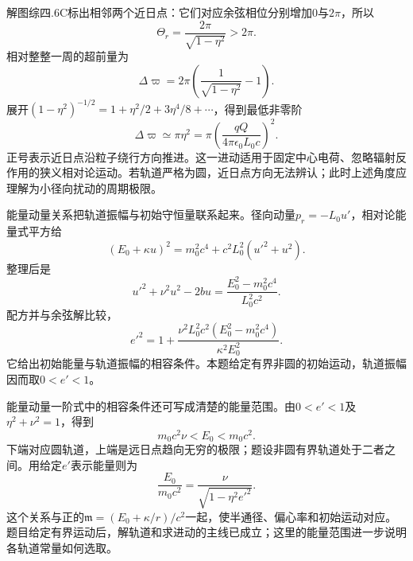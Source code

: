 \documentclass[UTF8,fontset=fandol,a4paper,11pt]{ctexart}
\begin{document}
解图综四.6C标出相邻两个近日点：它们对应余弦相位分别增加$0$与$2\pi$，所以
\[
\boxed{\Theta_r=\frac{2\pi}{\sqrt{1-\eta^2}}>2\pi}.
\]
相对整整一周的超前量为
\[
\boxed{\Delta\varpi=
2\pi\left(\frac1{\sqrt{1-\eta^2}}-1\right)}.
\]
展开$(1-\eta^2)^{-1/2}=1+\eta^2/2+3\eta^4/8+\cdots$，得到最低非零阶
\[
\boxed{\Delta\varpi\simeq\pi\eta^2
=\pi\left(\frac{qQ}{4\pi\epsilon_0L_0c}\right)^2}.
\]
正号表示近日点沿粒子绕行方向推进。这一进动适用于固定中心电荷、忽略辐射反作用的狭义相对论运动。若轨道严格为圆，近日点方向无法辨认；此时上述角度应理解为小径向扰动的周期极限。

能量动量关系把轨道振幅与初始守恒量联系起来。径向动量$p_r=-L_0u'$，相对论能量式平方给
\[
(E_0+\kappa u)^2
=m_0^2c^4+c^2L_0^2(u'^2+u^2).
\]
整理后是
\[
u'^2+\nu^2u^2-2bu
=\frac{E_0^2-m_0^2c^4}{L_0^2c^2}.
\]
配方并与余弦解比较，
\[
e'^2=1+
\frac{\nu^2L_0^2c^2(E_0^2-m_0^2c^4)}{\kappa^2E_0^2}.
\]
它给出初始能量与轨道振幅的相容条件。本题给定有界非圆的初始运动，轨道振幅因而取$0<e'<1$。

能量动量一阶式中的相容条件还可写成清楚的能量范围。由$0<e'<1$及$\eta^2+\nu^2=1$，得到
\[
m_0c^2\nu<E_0<m_0c^2.
\]
下端对应圆轨道，上端是远日点趋向无穷的极限；题设非圆有界轨道处于二者之间。用给定$e'$表示能量则为
\[
\frac{E_0}{m_0c^2}=\frac{\nu}{\sqrt{1-\eta^2e'^2}}.
\]
这个关系与正的$\mathfrak m=(E_0+\kappa/r)/c^2$一起，使半通径、偏心率和初始运动对应。题目给定有界运动后，解轨道和求进动的主线已成立；这里的能量范围进一步说明各轨道常量如何选取。
\end{document}
